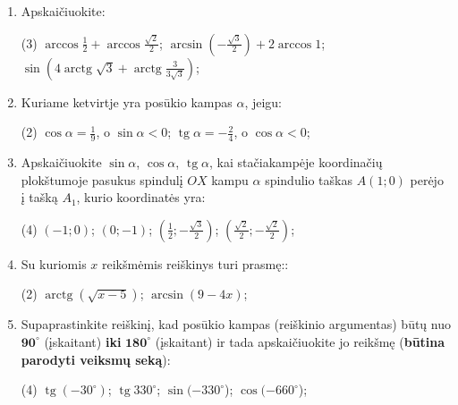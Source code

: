 \documentclass[a4paper]{article}
\DeclareMathOperator{\tg}{tg}
\DeclareMathOperator{\arctg}{arctg}
\begin{document}
\begin{enumerate}
      \item Apskaičiuokite:

            \begin{tasks}[item-format={\normalfont}, after-item-skip=4mm](3)
                  \task $\arccos{\frac{1}{2}} + \arccos{\frac{\sqrt{2}}{2}} $;
                  \task $\arcsin{(-\frac{\sqrt{3}}{2})} + 2\arccos{1} $;
                  \task $\sin({4\arctg{\sqrt{3}} +
                              \arctg{\frac{3}{3\sqrt{3}}}})  $;

            \end{tasks}

      \item Kuriame ketvirtje yra posūkio kampas $\alpha$, jeigu:
            \begin{tasks}[item-format={\normalfont}, after-item-skip=4mm](2)
                  \task $\cos \alpha = \frac{1}{9}$, o $\sin \alpha < 0$;
                  \task $\tg \alpha = -\frac{2}{4}$, o $\cos \alpha < 0$;
            \end{tasks}
      \item Apskaičiuokite $\sin \alpha$, $\cos \alpha$, $\tg \alpha$, kai
            stačiakampėje koordinačių plokštumoje pasukus spindulį $OX$ kampu
            $\alpha$ spindulio taškas $A(1; 0)$ perėjo į tašką $A_{1}$, kurio
            koordinatės
            yra:
            \begin{tasks}[item-format={\normalfont}, after-item-skip=4mm](4)
                  \task $(-1; 0)$;
                  \task $(0; -1)$;
                  \task $(\frac{1}{2}; -\frac{\sqrt{3}}{2})$;
                  \task $(\frac{\sqrt{2}}{2}; -\frac{\sqrt{2}}{2})$;
            \end{tasks}

      \item Su kuriomis $x$ reikšmėmis reiškinys turi prasmę::
            \begin{tasks}[item-format={\normalfont},
                        after-item-skip=4mm](2)
                  \task $\arctg(\sqrt{x-5})$;
                  \task $\arcsin(9-4x)$;
            \end{tasks}

      \item Supaprastinkite reiškinį, kad posūkio kampas (reiškinio
            argumentas) būtų nuo
            \textbf{$\boldsymbol{90^\circ}$} (įskaitant)
            \textbf{iki}	$\boldsymbol{180^\circ}$ (įskaitant) ir tada
            apskaičiuokite jo
            reikšmę
            (\textbf{būtina parodyti veiksmų seką}):
            \begin{tasks}[item-format={\normalfont},
                        after-item-skip=4mm](4)
                  \task $\tg (-30^\circ)$;
                  \task $\tg 330^\circ$;
                  \task $\sin (-330^\circ$);
                        \task $\cos (-660^\circ$);
            \end{tasks}


\end{enumerate}
\end{document}

